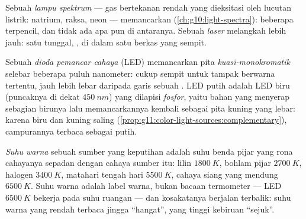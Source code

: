 \begin{definition}\label{def:g11:color-light-sources:lamps}
Sebuah \emph{lampu spektrum} --- gas bertekanan
rendah yang dieksitasi oleh lucutan listrik: natrium, raksa, neon ---
memancarkan  (\cref{ch:g10:light-spectra}): beberapa
 terpencil, dan tidak ada apa pun di antaranya. Sebuah
\emph{laser} melangkah lebih jauh: satu 
tunggal, , di dalam satu berkas yang sempit.
\end{definition}

\begin{definition}[LED]\label{def:g11:color-light-sources:led}
Sebuah \emph{dioda pemancar cahaya} (LED)
memancarkan pita \emph{kuasi-monokromatik}
selebar beberapa puluh nanometer: cukup sempit untuk tampak berwarna
tertentu, jauh lebih lebar daripada garis sebuah . LED putih adalah
LED biru (puncaknya di dekat $\qty{450}{nm}$) yang dilapisi
\emph{fosfor}, yaitu bahan yang menyerap sebagian birunya
lalu memancarkannya kembali sebagai pita kuning yang lebar: karena biru
dan kuning saling 
(\cref{prop:g11:color-light-sources:complementary}), campurannya
terbaca sebagai putih.
\end{definition}

\begin{definition}\label{def:g11:color-light-sources:colortemp}
\emph{Suhu warna} sebuah sumber yang keputihan adalah
suhu benda pijar yang rona cahayanya sepadan dengan cahaya sumber itu:
lilin $\qty{1800}{K}$, bohlam pijar $\qty{2700}{K}$, halogen
$\qty{3400}{K}$, matahari tengah hari $\qty{5500}{K}$, cahaya siang yang
mendung $\qty{6500}{K}$. Suhu warna adalah label warna, bukan bacaan
termometer --- LED $\qty{6500}{K}$ bekerja pada suhu ruangan --- dan
kosakatanya berjalan terbalik: suhu warna yang rendah terbaca jingga
``hangat'', yang tinggi kebiruan ``sejuk''.
\end{definition}

